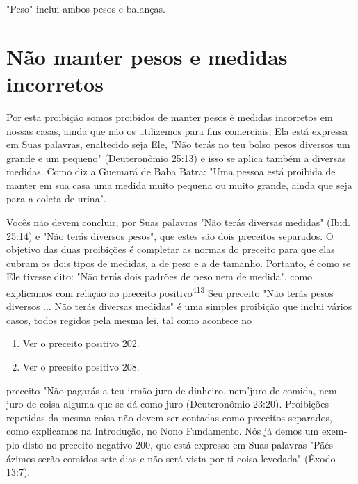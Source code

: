\begin{itemize}
\begin{enumrate}
\begin{itemize}
\begin{itemize}
\begin{itemize}
"Peso" inclui ambos pesos e balanças.

\section{Não manter pesos e medidas incorretos}

Por esta proibição somos proibidos de manter pesos è medidas in­corretos
em nossas casas, ainda que não os utilizemos para fins comerciais, Ela
está expressa em Suas palavras, enaltecido seja Ele, "Não terás no teu
bolso pe­sos diversos um grande e um pequeno" (Deuteronômio 25:13) e
isso se aplica também a diversas medidas. Como diz a Guemará de Baba
Batra: "Uma pessoa está proibida de manter em sua casa uma medida muito
pequena ou muito gran­de, ainda que seja para a coleta de urina".

Vocês não devem concluir, por Suas palavras "Não terás diversas
me­didas" (Ibid. 25:14) e "Não terás diversos pesos", que estes são dois
preceitos separados. O objetivo das duas proibições é completar as
normas do preceito para que elas cubram os dois tipos de medidas, a de
peso e a de tamanho. Por­tanto, é como se Ele tivesse dito: "Não terás
dois padrões de peso nem de me­dida", como explicamos com relação ao
preceito positivo\textsuperscript{413} Seu preceito "Não terás pesos
diversos ... Não terás diversas medidas" é uma simples proibi­ção que
inclui vários casos, todos regidos pela mesma lei, tal como acontece no


\begin{enumerate}
\def\labelenumi{\arabic{enumi}.}
\setcounter{enumi}{411}
\item
 
 Ver o preceito positivo 202.
 
\item
 
 Ver o preceito positivo 208.
 
\end{enumerate}



preceito "Não pagarás a teu irmão juro de dinheiro, nem'juro de comida,
nem juro de coisa alguma que se dá como juro (Deuteronômio 23:20).
Proibições repetidas da mesma coisa não devem ser contadas como
preceitos separados, como explicamos na Introdução, no Nono Fundamento.
Nós já demos um exem­plo disto no preceito negativo 200, que está
expresso em Suas palavras "Pãés ázimos serão comidos sete dias e não
será vista por ti coisa levedada" (Êxodo 13:7).


\end{itemize}
\end{itemize}
\end{itemize}
\end{enumrate}
\end{itemize}
